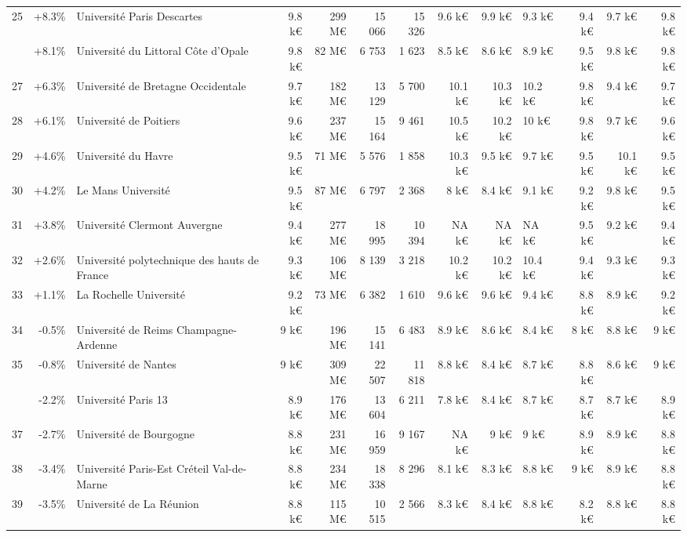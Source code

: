 \documentclass[12pt,french,landscape]{article}
\begin{document}
\begin{longtable}{rrlrrrrrrlrrr}
\rowcolor{gray!6}  25 & +8.3\% & Université Paris Descartes & 9.8 k€ & 299 M€ & 15 066 & 15 326 & 9.6 k€ & 9.9 k€ & 9.3 k€ & 9.4 k€ & 9.7 k€ & 9.8 k€\\
\addlinespace
26 & +8.1\% & Université du Littoral Côte d'Opale & 9.8 k€ & 82 M€ & 6 753 & 1 623 & 8.5 k€ & 8.6 k€ & 8.9 k€ & 9.5 k€ & 9.8 k€ & 9.8 k€\\
\rowcolor{gray!6}  27 & +6.3\% & Université de Bretagne Occidentale & 9.7 k€ & 182 M€ & 13 129 & 5 700 & 10.1 k€ & 10.3 k€ & 10.2 k€ & 9.8 k€ & 9.4 k€ & 9.7 k€\\
28 & +6.1\% & Université de Poitiers & 9.6 k€ & 237 M€ & 15 164 & 9 461 & 10.5 k€ & 10.2 k€ & 10 k€ & 9.8 k€ & 9.7 k€ & 9.6 k€\\
\rowcolor{gray!6}  29 & +4.6\% & Université du Havre & 9.5 k€ & 71 M€ & 5 576 & 1 858 & 10.3 k€ & 9.5 k€ & 9.7 k€ & 9.5 k€ & 10.1 k€ & 9.5 k€\\
30 & +4.2\% & Le Mans Université & 9.5 k€ & 87 M€ & 6 797 & 2 368 & 8 k€ & 8.4 k€ & 9.1 k€ & 9.2 k€ & 9.8 k€ & 9.5 k€\\
\addlinespace
\rowcolor{gray!6}  31 & +3.8\% & Université Clermont Auvergne & 9.4 k€ & 277 M€ & 18 995 & 10 394 & NA k€ & NA k€ & NA k€ & 9.5 k€ & 9.2 k€ & 9.4 k€\\
32 & +2.6\% & Université polytechnique des hauts de France & 9.3 k€ & 106 M€ & 8 139 & 3 218 & 10.2 k€ & 10.2 k€ & 10.4 k€ & 9.4 k€ & 9.3 k€ & 9.3 k€\\
\rowcolor{gray!6}  33 & +1.1\% & La Rochelle Université & 9.2 k€ & 73 M€ & 6 382 & 1 610 & 9.6 k€ & 9.6 k€ & 9.4 k€ & 8.8 k€ & 8.9 k€ & 9.2 k€\\
34 & -0.5\% & Université de Reims Champagne-Ardenne & 9 k€ & 196 M€ & 15 141 & 6 483 & 8.9 k€ & 8.6 k€ & 8.4 k€ & 8 k€ & 8.8 k€ & 9 k€\\
\rowcolor{gray!6}  35 & -0.8\% & Université de Nantes & 9 k€ & 309 M€ & 22 507 & 11 818 & 8.8 k€ & 8.4 k€ & 8.7 k€ & 8.8 k€ & 8.6 k€ & 9 k€\\
\addlinespace
36 & -2.2\% & Université Paris 13 & 8.9 k€ & 176 M€ & 13 604 & 6 211 & 7.8 k€ & 8.4 k€ & 8.7 k€ & 8.7 k€ & 8.7 k€ & 8.9 k€\\
\rowcolor{gray!6}  37 & -2.7\% & Université de Bourgogne & 8.8 k€ & 231 M€ & 16 959 & 9 167 & NA k€ & 9 k€ & 9 k€ & 8.9 k€ & 8.9 k€ & 8.8 k€\\
38 & -3.4\% & Université Paris-Est Créteil Val-de-Marne & 8.8 k€ & 234 M€ & 18 338 & 8 296 & 8.1 k€ & 8.3 k€ & 8.8 k€ & 9 k€ & 8.9 k€ & 8.8 k€\\
\rowcolor{gray!6}  39 & -3.5\% & Université de La Réunion & 8.8 k€ & 115 M€ & 10 515 & 2 566 & 8.3 k€ & 8.4 k€ & 8.8 k€ & 8.2 k€ & 8.8 k€ & 8.8 k€\\

\end{longtable}
\end{document}
